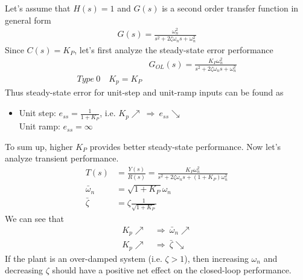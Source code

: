 \documentclass[twoside]{article}
\begin{document}
Let's assume that $H(s) = 1$ and $G(s)$ is a second order
transfer function in general form 
%
  \begin{align*}
  G(s) = \frac{\omega_n^2}{s^2 + 2 \zeta \omega_n s + \omega_n^2}
  \end{align*}
%
Since $C(s) = K_P$, let's first analyze the steady-state error performance
%
\begin{align*}
  &G_{OL}(s) = \frac{K_P \omega_n^2}{s^2 + 2 \zeta \omega_n s + \omega_n^2}
\\
 Type \ 0 \quad K_p = K_P
\end{align*}
% 
Thus steady-state error for unit-step and unit-ramp inputs can be found
as
\begin{itemize}
\item Unit step: $e_{ss} = \frac{1}{1 + K_P}$, i.e. $K_p \nearrow \
  \Rightarrow \ e_{ss} \searrow$  
\\ Unit ramp: $e_{ss} = \infty$
\end{itemize}
%
To sum up, higher $K_P$ provides better steady-state performance.
Now let's analyze transient performance.
%
%
  \begin{align*}
  T(s) &= \frac{Y(s)}{R(s)} = \frac{K_P \omega_n^2}{s^2 + 2 \zeta
    \omega_n s + (1 + K_P) \omega_n^2}
\\
 \bar{\omega}_n &= \sqrt{1 + K_P} \omega_n
\\
 \bar{\zeta} &= \zeta \frac{1}{ \sqrt{ 1 + K_P} } 
  \end{align*}
%
We can see that
%
  \begin{align*}
    K_p \nearrow \ &\Rightarrow \ \bar{\omega}_n \nearrow \\
   K_p \nearrow \ &\Rightarrow \ \bar{\zeta} \searrow  
  \end{align*}
%
If the plant is an over-damped system (i.e. $\zeta > 1$), then increasing
$\omega_n$ and decreasing $\zeta$ should have a positive net 
effect on the closed-loop performance. 
\end{document}
